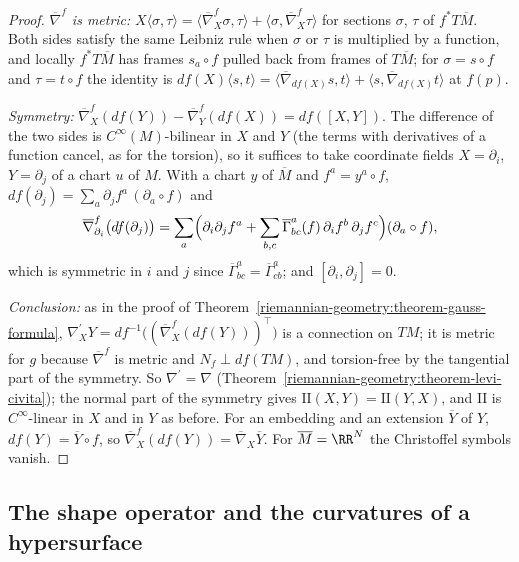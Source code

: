 \begin{proof}
\emph{$\overline{\nabla}^f$ is metric:} $X\langle\sigma, \tau\rangle = \langle\overline{\nabla}^f_X\sigma, \tau\rangle + \langle\sigma, \overline{\nabla}^f_X\tau\rangle$ for sections
$\sigma$, $\tau$ of $f^*T\overline{M}$. Both sides satisfy the same Leibniz rule when $\sigma$ or $\tau$ is multiplied by a function, and locally $f^*T\overline{M}$ has frames
$s_a \circ f$ pulled back from frames of $T\overline{M}$; for $\sigma = s \circ f$ and $\tau = t \circ f$ the identity is
$df(X)\langle s, t\rangle = \langle\overline{\nabla}_{df(X)}s, t\rangle + \langle s, \overline{\nabla}_{df(X)}t\rangle$ at $f(p)$.

\emph{Symmetry:} $\overline{\nabla}^f_X(df(Y)) - \overline{\nabla}^f_Y(df(X)) = df([X, Y])$. The difference of the two sides is $C^\infty(M)$-bilinear in $X$ and $Y$ (the terms with
derivatives of a function cancel, as for the torsion), so it suffices to take coordinate fields $X = \partial_i$, $Y = \partial_j$ of a chart $u$ of $M$. With a chart $y$ of
$\overline{M}$ and $f^a = y^a \circ f$, $df(\partial_j) = \sum_a\partial_jf^a\,(\partial_a \circ f)$ and
\[
\overline{\nabla}^f_{\partial_i}\bigl(df(\partial_j)\bigr) = \sum_a\Bigl(\partial_i\partial_jf^a + \sum_{b,c}\overline{\Gamma}^a_{bc}(f)\,\partial_if^b\,\partial_jf^c\Bigr)(\partial_a \circ f),
\]
which is symmetric in $i$ and $j$ since $\overline{\Gamma}^a_{bc} = \overline{\Gamma}^a_{cb}$; and $[\partial_i, \partial_j] = 0$.

\emph{Conclusion:} as in the proof of Theorem~\ref{riemannian-geometry:theorem-gauss-formula}, $\nabla^{\prime}_XY = df^{-1}\bigl((\overline{\nabla}^f_X(df(Y)))^\top\bigr)$ is a connection
on $TM$; it is metric for $g$ because $\overline{\nabla}^f$ is metric and $N_f \perp df(TM)$, and torsion-free by the tangential part of the symmetry. So $\nabla^{\prime} = \nabla$
(Theorem~\ref{riemannian-geometry:theorem-levi-civita}); the normal part of the symmetry gives $\mathrm{II}(X, Y) = \mathrm{II}(Y, X)$, and $\mathrm{II}$ is $C^\infty$-linear in $X$ and
in $Y$ as before. For an embedding and an extension $\overline{Y}$ of $Y$, $df(Y) = \overline{Y} \circ f$, so $\overline{\nabla}^f_X(df(Y)) = \overline{\nabla}_X\overline{Y}$. For
$\overline{M} = \RR^N$ the Christoffel symbols vanish.
\end{proof}

\subsection{The shape operator and the curvatures of a hypersurface}\label{riemannian-geometry:subsection-shape-operator}

